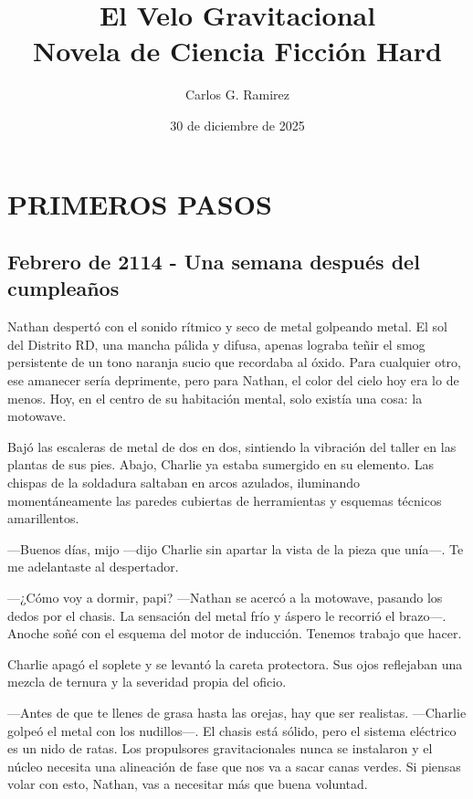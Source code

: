 \documentclass[12pt,a4paper]{book}
\title{\textbf{El Velo Gravitacional}\\[0.5cm]\large Novela de Ciencia Ficción Hard}
\author{Carlos G. Ramirez}
\date{30 de diciembre de 2025}
\begin{document}
\maketitle
\frontmatter
\tableofcontents
\newpage
\mainmatter

\chapter{PRIMEROS PASOS}

\section*{Febrero de 2114 - Una semana después del cumpleaños}

Nathan despertó con el sonido rítmico y seco de metal golpeando metal. El sol del Distrito RD, una mancha pálida y difusa, apenas lograba teñir el smog persistente de un tono naranja sucio que recordaba al óxido. Para cualquier otro, ese amanecer sería deprimente, pero para Nathan, el color del cielo hoy era lo de menos. Hoy, en el centro de su habitación mental, solo existía una cosa: la motowave.

Bajó las escaleras de metal de dos en dos, sintiendo la vibración del taller en las plantas de sus pies. Abajo, Charlie ya estaba sumergido en su elemento. Las chispas de la soldadura saltaban en arcos azulados, iluminando momentáneamente las paredes cubiertas de herramientas y esquemas técnicos amarillentos.

---Buenos días, mijo ---dijo Charlie sin apartar la vista de la pieza que unía---. Te me adelantaste al despertador.

---¿Cómo voy a dormir, papi? ---Nathan se acercó a la motowave, pasando los dedos por el chasis. La sensación del metal frío y áspero le recorrió el brazo---. Anoche soñé con el esquema del motor de inducción. Tenemos trabajo que hacer.

Charlie apagó el soplete y se levantó la careta protectora. Sus ojos reflejaban una mezcla de ternura y la severidad propia del oficio.

---Antes de que te llenes de grasa hasta las orejas, hay que ser realistas. ---Charlie golpeó el metal con los nudillos---. El chasis está sólido, pero el sistema eléctrico es un nido de ratas. Los propulsores gravitacionales nunca se instalaron y el núcleo necesita una alineación de fase que nos va a sacar canas verdes. Si piensas volar con esto, Nathan, vas a necesitar más que buena voluntad.
\end{document}
